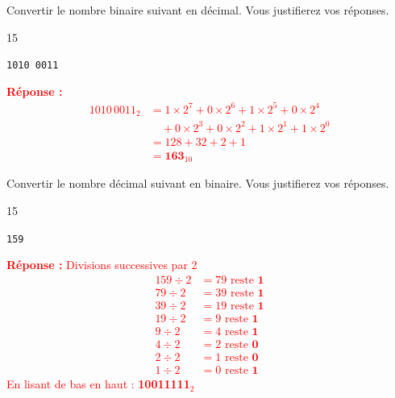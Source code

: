 \documentclass[a4paper,10pt]{report}
\def\ptsexoB{1}
\def\ptsexoC{1}
\begin{document}
\begin{minipage}{0.49\linewidth}
 \exods{\ptsexoB}

   Convertir le nombre binaire suivant en décimal. Vous justifierez vos réponses.

\begin{answer}{1}{5} 
    \begin{center}
        \verb|1010 0011|
    \end{center}   
\end{answer}

\textcolor{red}{
\textbf{Réponse :}
\begin{align*}
1010\,0011_2 &= 1 \times 2^7 + 0 \times 2^6 + 1 \times 2^5 + 0 \times 2^4 \\
&\quad + 0 \times 2^3 + 0 \times 2^2 + 1 \times 2^1 + 1 \times 2^0 \\
&= 128 + 32 + 2 + 1 \\
&= \textbf{163}_{10}
\end{align*}
}
\end{minipage}\hfill
\begin{minipage}{0.49\linewidth}
     \exods{\ptsexoC}

    Convertir le nombre décimal suivant en binaire. Vous justifierez vos réponses.
\begin{answer}{1}{5} 
    \begin{center}
        \verb|159|
    \end{center}   
\end{answer}

\textcolor{red}{
\textbf{Réponse :} Divisions successives par 2
\begin{align*}
159 \div 2 &= 79 \text{ reste } \textbf{1} \\
79 \div 2 &= 39 \text{ reste } \textbf{1} \\
39 \div 2 &= 19 \text{ reste } \textbf{1} \\
19 \div 2 &= 9 \text{ reste } \textbf{1} \\
9 \div 2 &= 4 \text{ reste } \textbf{1} \\
4 \div 2 &= 2 \text{ reste } \textbf{0} \\
2 \div 2 &= 1 \text{ reste } \textbf{0} \\
1 \div 2 &= 0 \text{ reste } \textbf{1}
\end{align*}
En lisant de bas en haut : \textbf{10011111}$_2$
}
\end{minipage}

\medskip
\end{document}
